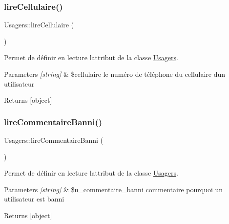 \subsubsection{\texorpdfstring{lire\+Cellulaire()}{lireCellulaire()}}
{\footnotesize\ttfamily Usagers\+::lire\+Cellulaire (\begin{DoxyParamCaption}{ }\end{DoxyParamCaption})}



Permet de définir en lecture l\textquotesingle{}attribut de la classe \hyperlink{class_usagers}{Usagers}. 


\begin{DoxyParams}{Parameters}
{\em \mbox{[}string\mbox{]}} & \$cellulaire le numéro de téléphone du cellulaire d\textquotesingle{}un utilisateur \\
\hline
\end{DoxyParams}
\begin{DoxyReturn}{Returns}
\mbox{[}object\mbox{]} 
\end{DoxyReturn}
\mbox{\label{class_usagers_a6e1d316a863916d5d185f1df24bad1ec}} 
\subsubsection{\texorpdfstring{lire\+Commentaire\+Banni()}{lireCommentaireBanni()}}
{\footnotesize\ttfamily Usagers\+::lire\+Commentaire\+Banni (\begin{DoxyParamCaption}{ }\end{DoxyParamCaption})}



Permet de définir en lecture l\textquotesingle{}attribut de la classe \hyperlink{class_usagers}{Usagers}. 


\begin{DoxyParams}{Parameters}
{\em \mbox{[}string\mbox{]}} & \$u\+\_\+commentaire\+\_\+banni commentaire pourquoi un utilisateur est banni \\
\hline
\end{DoxyParams}
\begin{DoxyReturn}{Returns}
\mbox{[}object\mbox{]} 
\end{DoxyReturn}
\mbox{\label{class_usagers_a51e81c34f159c53639be221e034cad44}} 
